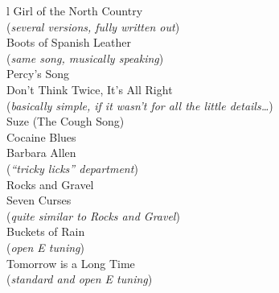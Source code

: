 \begin{ctabular}{l}
Girl of the North Country \\
\hspace{2em} (\textit{several versions, fully written out}) \\
Boots of Spanish Leather \\
\hspace{2em} (\textit{same song, musically speaking}) \\
Percy's Song \\
Don't Think Twice, It's All Right \\
\hspace{2em} (\textit{basically simple, if it wasn't for all the little details\ldots}) \\
Suze (The Cough Song) \\
Cocaine Blues \\
Barbara Allen \\
\hspace{2em} (\textit{``tricky licks'' department}) \\
Rocks and Gravel \\
Seven Curses \\
\hspace{2em} (\textit{quite similar to \textnormal{Rocks and Gravel}}) \\
Buckets of Rain \\
\hspace{2em} (\textit{open E tuning}) \\
Tomorrow is a Long Time \\
\hspace{2em} (\textit{standard and open E tuning})
\end{ctabular}

